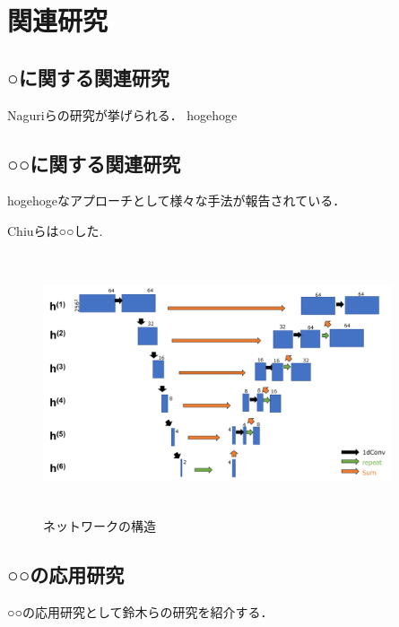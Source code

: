 \chapter{関連研究}
\section{○に関する関連研究}
\label{sec:2.1}
Naguriら\cite{naguri}の研究が挙げられる．
hogehoge

\section{○○に関する関連研究}
\label{sec:2.2}
hogehogeなアプローチとして様々な手法が報告されている．

Chiuら\cite{chiu1}は○○した.

\begin{figure}[h]
 \centering
\includegraphics[keepaspectratio,width=103mm,height=77mm]{fig/net_example.png}
\caption{ネットワークの構造}
\label{fig:unet}
\end{figure}

\section{○○の応用研究}
\label{sec:2.3}
○○の応用研究として鈴木ら\cite{suzuki}の研究を紹介する．
